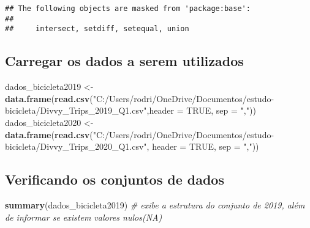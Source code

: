 \documentclass[
]{article}
\newenvironment{Shaded}{\begin{snugshade}}{\end{snugshade}}
\newcommand{\AttributeTok}[1]{\textcolor[rgb]{0.13,0.29,0.53}{#1}}
\newcommand{\CommentTok}[1]{\textcolor[rgb]{0.56,0.35,0.01}{\textit{#1}}}
\newcommand{\ConstantTok}[1]{\textcolor[rgb]{0.56,0.35,0.01}{#1}}
\newcommand{\FunctionTok}[1]{\textcolor[rgb]{0.13,0.29,0.53}{\textbf{#1}}}
\newcommand{\NormalTok}[1]{#1}
\newcommand{\OtherTok}[1]{\textcolor[rgb]{0.56,0.35,0.01}{#1}}
\newcommand{\StringTok}[1]{\textcolor[rgb]{0.31,0.60,0.02}{#1}}
\begin{document}
\begin{verbatim}
## The following objects are masked from 'package:base':
## 
##     intersect, setdiff, setequal, union
\end{verbatim}

\subsection{Carregar os dados a serem
utilizados}\label{carregar-os-dados-a-serem-utilizados}

\begin{Shaded}
\begin{Highlighting}[]
\NormalTok{dados\_bicicleta2019 }\OtherTok{\textless{}{-}} \FunctionTok{data.frame}\NormalTok{(}\FunctionTok{read.csv}\NormalTok{(}\StringTok{"C:/Users/rodri/OneDrive/Documentos/estudo{-}bicicleta/Divvy\_Trips\_2019\_Q1.csv"}\NormalTok{,}\AttributeTok{header =} \ConstantTok{TRUE}\NormalTok{, }\AttributeTok{sep =} \StringTok{","}\NormalTok{))}
\NormalTok{dados\_bicicleta2020 }\OtherTok{\textless{}{-}} \FunctionTok{data.frame}\NormalTok{(}\FunctionTok{read.csv}\NormalTok{(}\StringTok{"C:/Users/rodri/OneDrive/Documentos/estudo{-}bicicleta/Divvy\_Trips\_2020\_Q1.csv"}\NormalTok{, }\AttributeTok{header =}  \ConstantTok{TRUE}\NormalTok{, }\AttributeTok{sep =} \StringTok{","}\NormalTok{))}
\end{Highlighting}
\end{Shaded}

\subsection{Verificando os conjuntos de
dados}\label{verificando-os-conjuntos-de-dados}

\begin{Shaded}
\begin{Highlighting}[]
\FunctionTok{summary}\NormalTok{(dados\_bicicleta2019) }\CommentTok{\# exibe a estrutura do conjunto de 2019, além de informar se existem valores nulos(NA)}
\end{Highlighting}
\end{Shaded}
\end{document}
